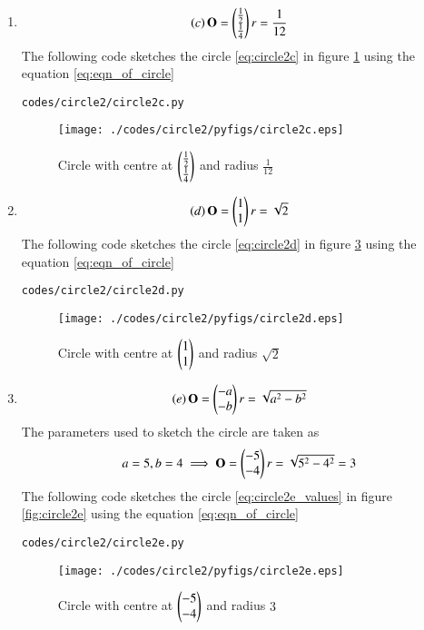 \begin{enumerate}[label=\thesection.\arabic*.,ref=\thesection.\theenumi]
\item
\begin{align}
\left(c\right)\mathbf{O}=\begin{pmatrix}\frac{1}{2}\\\frac{1}{4}\end{pmatrix}
r=\frac{1}{12}
\label{eq:circle2c}
\end{align}
The following code sketches the circle \ref{eq:circle2c} in figure \ref{fig:circle2c} using the equation \ref{eq:eqn_of_circle}
\begin{lstlisting}
codes/circle2/circle2c.py
\end{lstlisting}
\begin{figure}[!ht]
\centering
\texttt{[image: ./codes/circle2/pyfigs/circle2c.eps]}
\caption{Circle with centre at $\begin{pmatrix}\frac{1}{2}\\\frac{1}{4}\end{pmatrix}$ and radius $\frac{1}{12}$}
\label{fig:circle2c}
\end{figure}


\item
\begin{align}
\left(d\right)\mathbf{O}=\begin{pmatrix}1\\1\end{pmatrix}
r=\sqrt{2}
\label{eq:circle2d}
\end{align}
The following code sketches the circle \ref{eq:circle2d} in figure \ref{fig:circle2d} using the equation \ref{eq:eqn_of_circle}
\begin{lstlisting}
codes/circle2/circle2d.py
\end{lstlisting}
\begin{figure}[!ht]
\centering
\texttt{[image: ./codes/circle2/pyfigs/circle2d.eps]}
\caption{Circle with centre at $\begin{pmatrix}1\\1\end{pmatrix}$ and radius $\sqrt{2}$}
\label{fig:circle2d}
\end{figure}

\item
\begin{align}
\left(e\right)\mathbf{O}=\begin{pmatrix}-a\\-b\end{pmatrix}
r=\sqrt{a^2-b^2}
\label{eq:circle2e}
\end{align}
The parameters used to sketch the circle are taken as 
\begin{align}
a=5,b=4
\implies \mathbf{O}=\begin{pmatrix}-5\\-4\end{pmatrix}
r=\sqrt{5^2-4^2}=3
\label{eq:circle2e_values}
\end{align}
The following code sketches the circle \ref{eq:circle2e_values} in figure \ref{fig:circle2e} using the equation \ref{eq:eqn_of_circle}
\begin{lstlisting}
codes/circle2/circle2e.py
\end{lstlisting}
\begin{figure}[!ht]
\centering
\texttt{[image: ./codes/circle2/pyfigs/circle2e.eps]}
\caption{Circle with centre at $\begin{pmatrix}-5\\-4\end{pmatrix}$ and radius $3$}
\label{fig:circle2d}
\end{figure}



\end{enumerate}
